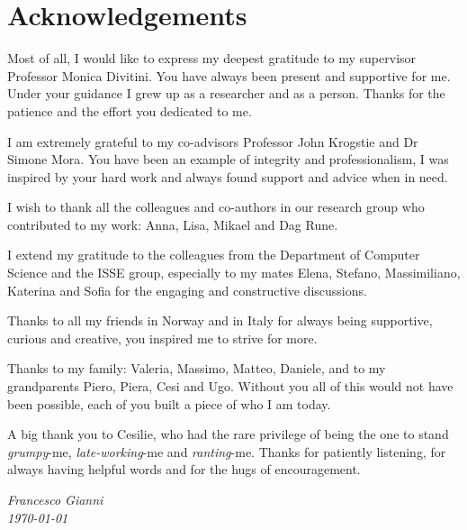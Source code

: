 \chapter{Acknowledgements}
\enlargethispage{\baselineskip}

Most of all, I would like to express my deepest gratitude to my supervisor Professor Monica Divitini. You have always been present and supportive for me. Under your guidance I grew up as a researcher and as a person. Thanks for the patience and the effort you dedicated to me.

I am extremely grateful to my co-advisors Professor John Krogstie and Dr Simone Mora. You have been an example of integrity and professionalism, I was inspired by your hard work and always found support and advice when in need.

I wish to thank all the colleagues and co-authors in our research group who contributed to my work: Anna, Lisa, Mikael and Dag Rune.

I extend my gratitude to the colleagues from the Department of Computer Science and the ISSE group, especially to my mates Elena, Stefano, Massimiliano, Katerina and Sofia for the engaging and constructive discussions.

Thanks to all my friends in Norway and in Italy for always being supportive, curious and creative, you inspired me to strive for more.

Thanks to my family: Valeria, Massimo, Matteo, Daniele, and to my grandparents Piero, Piera, Cesi and Ugo. Without you all of this would not have been possible, each of you built a piece of who I am today.

A big thank you to Cesilie, who had the rare privilege of being the one to stand \textit{grumpy}-me, \textit{late-working}-me and \textit{ranting}-me. Thanks for patiently listening, for always having helpful words and for the hugs of encouragement.

\begin{flushright}
\emph{\small Francesco Gianni}\\\emph{\small \today}
\end{flushright}
